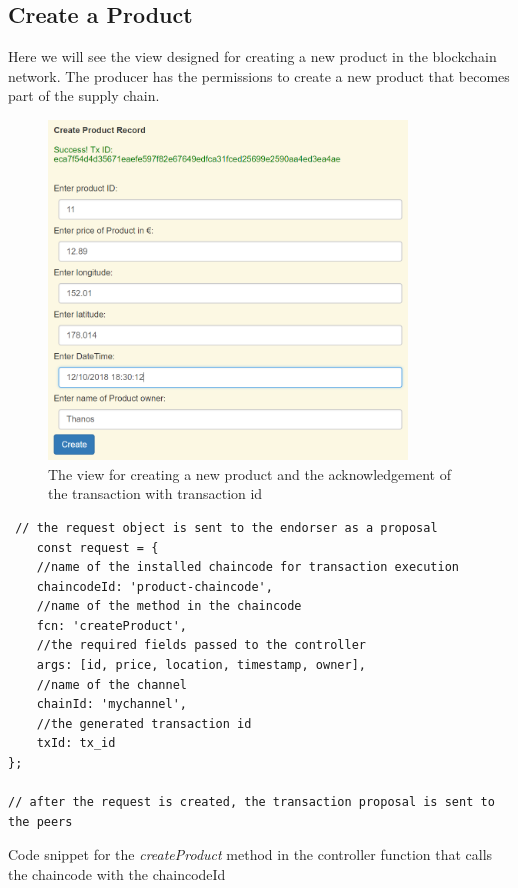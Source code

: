 \documentclass[
  a4paper,  %
  twoside,  %
  bibliography=totoc,
  headsepline,
  cleardoublepage=empty,
  parskip=half,
  draft=false
]{scrbook}
\begin{document}
\subsection{Create a Product}
Here we will see the view designed for creating a new product in the blockchain network. The producer has the permissions to create a new product that becomes part of the supply chain.
\begin{figure}[h!]
\begin{center}
\includegraphics[width=\textwidth, height=9cm, keepaspectratio]{graphics/createProductSuccess.png}
\caption{The view for creating a new product and the acknowledgement of the transaction with transaction id}
\label{fig:cp}
\end{center}
\end{figure}
\begin{Listing}[h!]
\begin{lstlisting}
 // the request object is sent to the endorser as a proposal
    const request = {
    //name of the installed chaincode for transaction execution
    chaincodeId: 'product-chaincode',
    //name of the method in the chaincode
    fcn: 'createProduct',
    //the required fields passed to the controller
    args: [id, price, location, timestamp, owner],
    //name of the channel
    chainId: 'mychannel',
    //the generated transaction id
    txId: tx_id
};

// after the request is created, the transaction proposal is sent to the peers
\end{lstlisting}
\caption{Code snippet for the \textit{createProduct} method in the controller function that calls the chaincode with the chaincodeId}
\label{lst:cpr}
\end{Listing}
\end{document}
